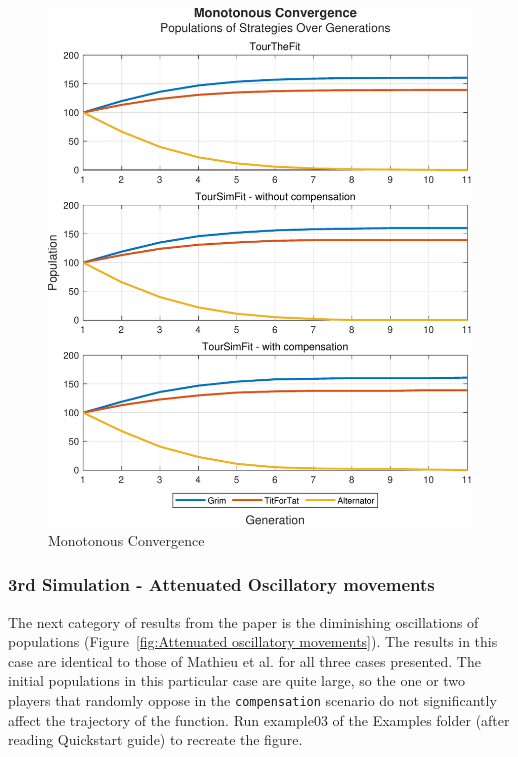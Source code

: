 \documentclass[12pt]{article}
\begin{document}
	\begin{figure}[h]
	      \centering
	      \includegraphics[scale=0.8]{Monotonous Convergence.pdf}
	      \caption{Monotonous Convergence}
	      \label{fig:Monotonous Convergence}
	\end{figure}
\subsubsection{3rd Simulation - Attenuated Oscillatory movements}
The next category of results from the paper is the diminishing oscillations of populations (Figure~\ref{fig:Attenuated oscillatory movements}). The results in this case are identical to those of Mathieu et al. for all three cases presented. The initial populations in this particular case are quite large, so the one or two players that randomly oppose in the \texttt{compensation} scenario do not significantly affect the trajectory of the function. Run example03 of the Examples folder (after reading Quickstart guide) to recreate the figure.
\end{document}
